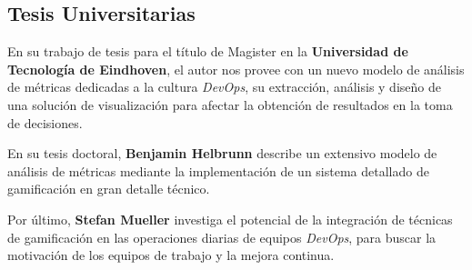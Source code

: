 \documentclass[journal]{IEEEtran}
\begin{document}
\subsection{\textbf{ \textbf{\large Tesis Universitarias}}}

\cite{kruis2014designing} En su trabajo de tesis para el título de Magister en la \textbf{Universidad de Tecnología de Eindhoven}, el autor nos provee con un nuevo modelo de análisis de métricas dedicadas a la cultura \textit{DevOps}, su extracción, análisis y diseño de una solución de visualización para afectar la obtención de resultados en la toma de decisiones.

\cite{heilbrunn2014towards} En su tesis doctoral, \textbf{Benjamin Helbrunn} describe un extensivo modelo de análisis de métricas mediante la implementación de un sistema detallado de gamificación en gran detalle técnico.

\cite{mueller2024leveraging} Por último, \textbf{Stefan Mueller} investiga el potencial de la integración de técnicas de gamificación en las operaciones diarias de equipos \textit{DevOps}, para buscar la motivación de los equipos de trabajo y la mejora continua.



\end{document}
